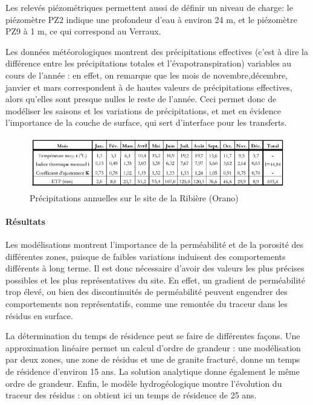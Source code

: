 \documentclass{article}
\begin{document}
Les relevés piézométriques permettent aussi de définir un niveau de charge: le piézomètre PZ2 indique une profondeur d’eau à environ 24 m, et le piézomètre PZ9 à 1 m, ce qui correspond au Verraux.

Les données météorologiques montrent des précipitations effectives (c’est à dire la différence entre les précipitations totales et l’évapotranspiration) variables au cours de l’année : en effet, on remarque que les mois de novembre,décembre, janvier et mars correspondent à de hautes valeurs de précipitations effectives, alors qu’elles sont presque nulles le reste de l’année. Ceci permet donc de modéliser les saisons et les variations de précipitations, et met en évidence l’importance de la couche de surface, qui sert d’interface pour les transferts.


\begin{figure}[H]
    \centering
    \includegraphics[width=0.8\linewidth]{III_B_3_4.png}
    \caption{Précipitations annuelles sur le site de la Ribière (Orano)}
    \label{fig:precipitations_ribiere}
\end{figure}

\paragraph{Résultats}

Les modélisations montrent l’importance de la perméabilité et de la porosité des différentes zones, puisque de faibles variations induisent des comportements différents à long terme. Il est donc nécessaire d’avoir des valeurs les plus précises possibles et les plus représentatives du site. En effet, un gradient de perméabilité trop élevé, ou bien des discontinuités de perméabilité peuvent engendrer des comportements non représentatifs, comme une remontée du traceur dans les résidus en surface.

La détermination du temps de résidence peut se faire de différentes façons. Une approximation linéaire permet un calcul d’ordre de grandeur : une modélisation par deux zones, une zone de résidus et une de granite fracturé, donne un temps de résidence d’environ 15 ans. La solution analytique donne également le même ordre de grandeur. Enfin, le modèle hydrogéologique montre l’évolution du traceur des résidus : on obtient ici un temps de résidence de 25 ans.
\end{document}
